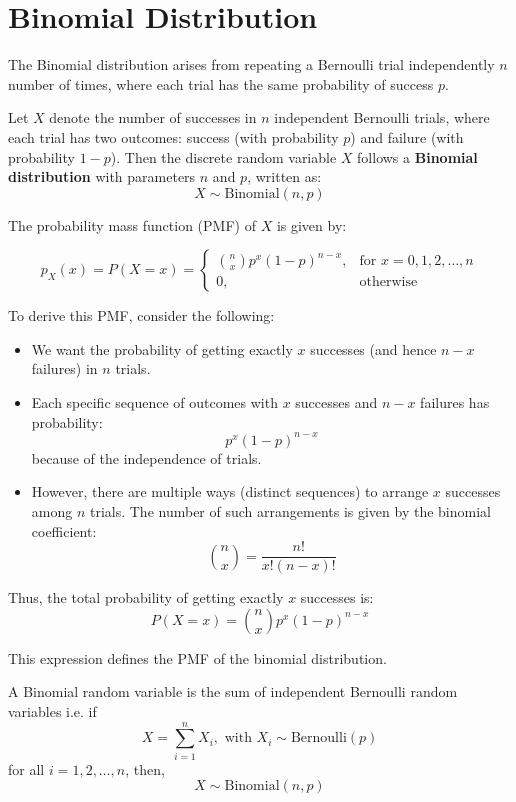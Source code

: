 \documentclass[twoside]{book}
\begin{document}
\section{Binomial Distribution}

The {Binomial distribution} arises from repeating a Bernoulli trial independently $n$ number of times, where each trial has the same probability of success $p$.


Let $X$ denote the number of successes in $n$ independent Bernoulli trials, where each trial has two outcomes: {success} (with probability $p$) and {failure} (with probability $1 - p$).
Then the discrete random variable $X$ follows a \textbf{Binomial distribution} with parameters $n$ and $p$, written as:
\[
X \sim \text{Binomial}(n, p)
\]

The probability mass function (PMF) of $X$ is given by:
\begin{textbox}
\[
p_X(x) = P(X = x) =
\begin{cases}
\binom{n}{x} p^x (1 - p)^{n - x}, & \text{for } x = 0, 1, 2, \ldots, n \\
0, & \text{otherwise}
\end{cases}
\]

\end{textbox}

To derive this PMF, consider the following:

\begin{itemize}
    \item We want the probability of getting exactly $x$ successes (and hence $n - x$ failures) in $n$ trials.
    \item Each specific sequence of outcomes with $x$ successes and $n - x$ failures has probability:
    \[
    p^x (1 - p)^{n - x}
    \]
    because of the independence of trials.
    \item However, there are multiple ways (distinct sequences) to arrange $x$ successes among $n$ trials. The number of such arrangements is given by the binomial coefficient:
    \[
    \binom{n}{x} = \frac{n!}{x!(n - x)!}
    \]
\end{itemize}

Thus, the total probability of getting exactly $x$ successes is:
\[
P(X = x) = \binom{n}{x} p^x (1 - p)^{n - x}
\]

This expression defines the PMF of the binomial distribution.

\begin{textbox}
    A Binomial random variable is the sum of independent Bernoulli random variables i.e. if $$X=\sum_{i=1}^{n} X_i, \text{ with } X_i\sim \text{Bernoulli}(p)$$ for all $i = 1,2,\dots, n$,
    then, $$X\sim \text{Binomial}(n, p)$$
\end{textbox}
\end{document}

